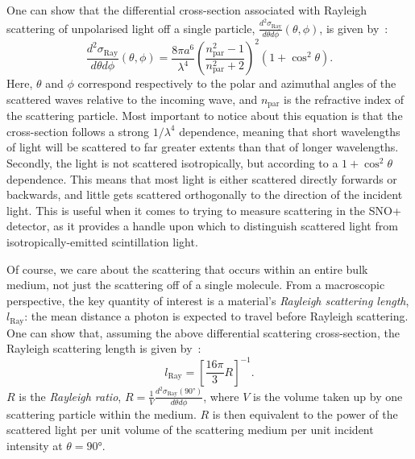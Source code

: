 One can show that the differential cross-section associated with Rayleigh scattering of unpolarised light off a single particle, $\frac{d^{2}\sigma_{\textrm{Ray}}}{d\theta d\phi}\left(\theta,\phi\right)$, is given by~\cite{jacksonSection10Scattering1998}: %
\begin{equation}
    \frac{d^{2}\sigma_{\textrm{Ray}}}{d\theta d\phi}\left(\theta,\phi\right) = \frac{8\pi a^{6}}{\lambda^{4}}\left(\frac{n_{\textrm{par}}^{2}-1}{n_{\textrm{par}}^{2}+2}\right)^{2} \left(1+\cos^{2}\theta\right).
\end{equation}
Here, $\theta$ and $\phi$ correspond respectively to the polar and azimuthal angles of the scattered waves relative to the incoming wave, and $n_{\mathrm{par}}$ is the refractive index of the scattering particle. Most important to notice about this equation is that the cross-section follows a strong $1/\lambda^{4}$ dependence, meaning that short wavelengths of light will be scattered to far greater extents than that of longer wavelengths. Secondly, the light is not scattered isotropically, but according to a $1+\cos^{2}\theta$ dependence. This means that most light is either scattered directly forwards or backwards, and little gets scattered orthogonally to the direction of the incident light. This is useful when it comes to trying to measure scattering in the SNO+ detector, as it provides a handle upon which to distinguish scattered light from isotropically-emitted scintillation light.

Of course, we care about the scattering that occurs within an entire bulk medium, not just the scattering off of a single molecule. From a macroscopic perspective, the key quantity of interest is a material's \textit{Rayleigh scattering length}, $l_{\textrm{Ray}}$: the mean distance a photon is expected to travel before Rayleigh scattering. One can show that, assuming the above differential scattering cross-section, the Rayleigh scattering length is given by~\cite{zhouRayleighScatteringLinear2015}: %
\begin{equation}
    l_{\textrm{Ray}} = \left[\frac{16\pi}{3}R\right]^{-1}.
\end{equation}
$R$ is the \textit{Rayleigh ratio}, $R=\frac{1}{V}\frac{d^{2}\sigma_{\textrm{Ray}}\left(\ang{90}\right)}{d\theta d\phi}$, where $V$ is the volume taken up by one scattering particle within the medium. $R$ is then equivalent to the power of the scattered light per unit volume of the scattering medium per unit incident intensity at $\theta=\ang{90}$.

